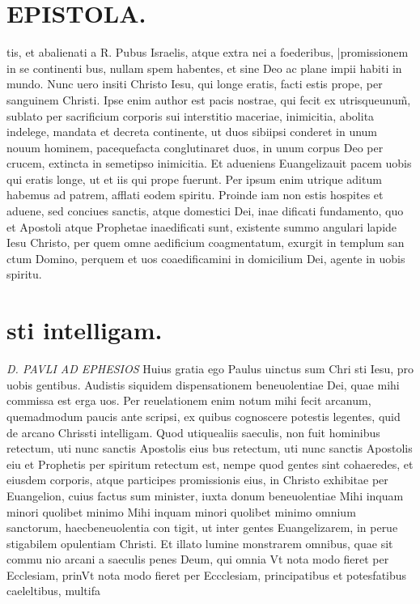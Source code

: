 \documentclass{article}
\begin{document}
\begin{pages}
\section*{EPISTOLA. }
\marginpar{[ p.11 ]}
\marginpar{[ p.50 ]}
\marginpar{[ p.60 ]}
\marginpar{[ p.70 ]}\pstart tis, et abalienati a R. Pubus  Israelis, atque extra nei a foederibus, |promissionem in se continenti bus, nullam spem habentes, et sine Deo ac plane impii habiti in mundo.  \pend\pstart Nunc uero insiti Christo Iesu, qui longe eratis, facti estis prope, per sanguinem Christi. Ipse enim author est pacis nostrae, qui fecit ex utrisqueunum̃, sublato per sacrificium corporis sui interstitio maceriae, inimicitia, abolita indelege, mandata et decreta continente, ut duos sibiipsi conderet in unum nouum hominem, pacequefacta conglutinaret duos, in unum corpus Deo per crucem, extincta in semetipso inimicitia.  \pend\pstart Et adueniens Euangelizauit pacem uobis qui eratis longe, ut et iis qui prope fuerunt. Per ipsum enim utrique aditum habemus ad patrem, afflati eodem spiritu.  \pend\pstart Proinde iam non estis hospites et aduene, sed conciues sanctis, atque domestici Dei, inae dificati fundamento, quo et Apostoli atque Prophetae inaedificati sunt, existente summo angulari lapide Iesu Christo, per quem omne aedificium coagmentatum, exurgit in templum san ctum Domino, perquem et uos coaedificamini in domicilium Dei, agente in uobis spiritu.  \pend
\section*{sti intelligam. }
\marginpar{[ p.1. ]}
\textit{D. PAVLI AD EPHESIOS }\pstart Huius gratia ego Paulus uinctus sum Chri sti Iesu, pro uobis gentibus.  Audistis siquidem dispensationem beneuolentiae Dei, quae mihi commissa est erga uos. Per reuelationem enim notum mihi fecit arcanum, quemadmodum paucis ante scripsi, ex quibus  cognoscere potestis legentes, quid de arcano Chrissti intelligam.  \pend\pstart Quod utiquealiis saeculis, non fuit hominibus retectum, uti nunc sanctis Apostolis eius bus retectum, uti nunc sanctis Apostolis eiu et Prophetis per spiritum retectum est, nempe quod gentes sint cohaeredes, et eiusdem corporis, atque participes promissionis eius, in Christo exhibitae per Euangelion, cuius factus sum minister, iuxta donum beneuolentiae  \pend\pstart Mihi inquam minori quolibet minimo Mihi inquam minori quolibet minimo omnium sanctorum, haecbeneuolentia con tigit, ut inter gentes Euangelizarem, in perue stigabilem opulentiam Christi. Et illato lumine monstrarem omnibus, quae sit commu nio arcani a saeculis penes Deum, qui omnia  \pend\pstart Vt nota modo fieret per Ecclesiam, prinVt nota modo fieret per Eccclesiam, principatibus et potesfatibus caeleltibus, multifa\pend

\end{pages}
\end{document}
